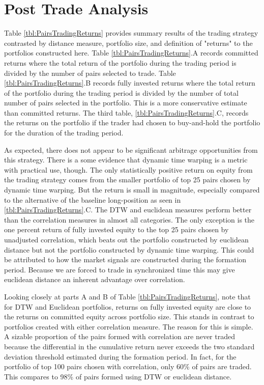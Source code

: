 \documentclass[12pt]{report}
\begin{document}
\section{Post Trade Analysis}

Table \ref{tbl:PairsTradingReturns} provides summary results of the trading strategy contrasted by distance measure, portfolio size, and definition of "returns" to the portfolios constructed here. Table \ref{tbl:PairsTradingReturns}.A records committed returns where the total return of the portfolio during the trading period is divided by the number of pairs selected to trade. Table \ref{tbl:PairsTradingReturns}.B records fully invested returns where the total return of the portfolio during the trading period is divided by the number of total number of pairs selected in the portfolio. This is a more conservative estimate than committed returns. The third table, \ref{tbl:PairsTradingReturns}.C, records the returns on the portfolio if the trader had chosen to buy-and-hold the portfolio for the duration of the trading period.

As expected, there does not appear to be significant arbitrage opportunities from this strategy. There is a some evidence that dynamic time warping is a metric with practical use, though. The only statistically positive return on equity from the trading strategy comes from the smaller portfolio of top 25 pairs chosen by dynamic time warping. But the return is small in magnitude, especially compared to the alternative of the baseline long-position as seen in \ref{tbl:PairsTradingReturns}.C. The DTW and euclidean measures perform better than the correlation measures in almost all categories. The only exception is the one percent return of fully invested equity to the top 25 pairs chosen by unadjusted correlation, which beats out the portfolio constructed by euclidean distance but not the portfolio constructed by dynamic time warping. This could be attributed to how the market signals are constructed during the formation period. Because we are forced to trade in synchronized time this may give euclidean distance an inherent advantage over correlation.

Looking closely at parts A and B of Table \ref{tbl:PairsTradingReturns}, note that for DTW and Euclidean portfolios, returns on fully invested equity are close to the returns on committed equity across portfolio size. This stands in contrast to portfolios created with either correlation measure. The reason for this is simple. A sizable proportion of the pairs formed with correlation are never traded because the differential in the cumulative return never exceeds the two standard deviation threshold estimated during the formation period. In fact, for the portfolio of top 100 pairs chosen with correlation, only 60\% of pairs are traded. This compares to 98\% of pairs formed using DTW or euclidean distance.
\end{document}
